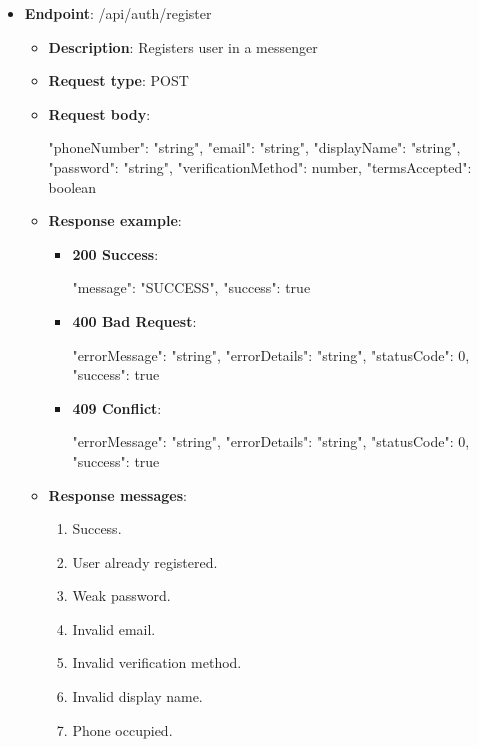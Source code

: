 \begin{itemize}
    \item \textbf{Endpoint}: /api/auth/register
    \begin{itemize}
        \item \textbf{Description}: Registers user in a messenger
        \item \textbf{Request type}: POST
        \item \textbf{Request body}:
        \begin{spverbatim}
        {
            "phoneNumber": "string",
            "email": "string",
            "displayName": "string",
            "password": "string",
            "verificationMethod": number,
            "termsAccepted": boolean
        }
        \end{spverbatim}
        \item  \textbf{Response example}:
        \begin{itemize}
            \item \textbf{200 Success}:
            \begin{spverbatim}
            {
                "message": "SUCCESS",
                "success": true
            }
            \end{spverbatim}
            \item \textbf{400 Bad Request}:
            \begin{spverbatim}
            {
                "errorMessage": "string",
                "errorDetails": "string",
                "statusCode": 0,
                "success": true
            }
            \end{spverbatim}
            \item \textbf{409 Conflict}:
            \begin{spverbatim}
            {
                "errorMessage": "string",
                "errorDetails": "string",
                "statusCode": 0,
                "success": true
            }
            \end{spverbatim}
        \end{itemize}
        \item \textbf{Response messages}:
        \begin{enumerate}
            \item Success.
            \item User already registered.
            \item Weak password.
            \item Invalid email.
            \item Invalid verification method.
            \item Invalid display name.
            \item Phone occupied.
        \end{enumerate}
    \end{itemize}


\end{itemize}
